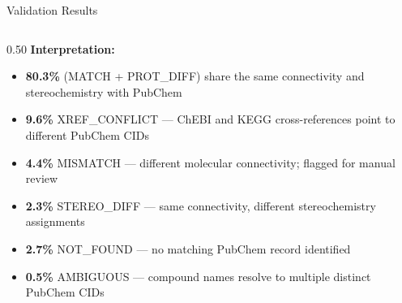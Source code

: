 \documentclass[aspectratio=169,11pt]{beamer}
\begin{document}
\begin{frame}{Validation Results}
\begin{columns}[T]
\begin{column}{0.50\textwidth}
\textbf{Interpretation:}\small
\begin{itemize}\setlength\itemsep{2pt}
  \item \textbf{80.3\%} (MATCH + PROT\_DIFF) share the same
        connectivity and stereochemistry with PubChem
  \item \textbf{9.6\%} XREF\_CONFLICT --- ChEBI and KEGG
        cross-references point to different PubChem CIDs
  \item \textbf{4.4\%} MISMATCH --- different molecular
        connectivity; flagged for manual review
  \item \textbf{2.3\%} STEREO\_DIFF --- same connectivity,
        different stereochemistry assignments
  \item \textbf{2.7\%} NOT\_FOUND --- no matching PubChem
        record identified
  \item \textbf{0.5\%} AMBIGUOUS --- compound names resolve to
        multiple distinct PubChem CIDs
\end{itemize}
\end{column}
\end{columns}

\end{frame}
\end{document}
